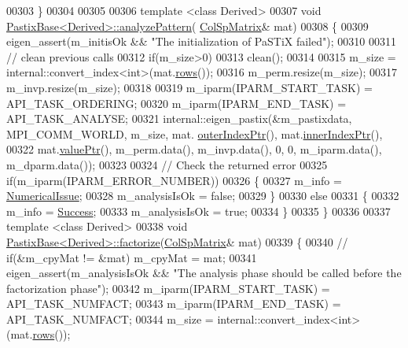 \begin{DoxyCode}
00303 \}
00304 
00305 
00306 \textcolor{keyword}{template} <\textcolor{keyword}{class} Derived>
00307 \textcolor{keywordtype}{void} \hyperlink{class_eigen_1_1_pastix_base}{PastixBase<Derived>::analyzePattern}(
      \hyperlink{group___sparse_core___module}{ColSpMatrix}& mat)
00308 \{                         
00309   eigen\_assert(m\_initisOk && \textcolor{stringliteral}{"The initialization of PaSTiX failed"});
00310   
00311   \textcolor{comment}{// clean previous calls}
00312   \textcolor{keywordflow}{if}(m\_size>0)
00313     clean();
00314   
00315   m\_size = internal::convert\_index<int>(mat.\hyperlink{group___sparse_core___module_a62e61bb861eee306d5b069ce652b5aa5}{rows}());
00316   m\_perm.resize(m\_size);
00317   m\_invp.resize(m\_size);
00318   
00319   m\_iparm(IPARM\_START\_TASK) = API\_TASK\_ORDERING;
00320   m\_iparm(IPARM\_END\_TASK) = API\_TASK\_ANALYSE;
00321   internal::eigen\_pastix(&m\_pastixdata, MPI\_COMM\_WORLD, m\_size, mat.
      \hyperlink{group___sparse_core___module_a75506964d86d6badb32d0b4917acf2e2}{outerIndexPtr}(), mat.\hyperlink{group___sparse_core___module_ae7b804bd39745156d20ca1611a296b67}{innerIndexPtr}(),
00322                mat.\hyperlink{group___sparse_core___module_a9d4354d3f4d121d764bbed33cac05329}{valuePtr}(), m\_perm.data(), m\_invp.data(), 0, 0, m\_iparm.data(), m\_dparm.data());
00323   
00324   \textcolor{comment}{// Check the returned error}
00325   \textcolor{keywordflow}{if}(m\_iparm(IPARM\_ERROR\_NUMBER))
00326   \{
00327     m\_info = \hyperlink{group__enums_gga85fad7b87587764e5cf6b513a9e0ee5eaaf9b736d310a664e7729d163a035cc5f}{NumericalIssue};
00328     m\_analysisIsOk = \textcolor{keyword}{false};
00329   \}
00330   \textcolor{keywordflow}{else}
00331   \{ 
00332     m\_info = \hyperlink{group__enums_gga85fad7b87587764e5cf6b513a9e0ee5ea52581b035f4b59c203b8ff999ef5fcea}{Success};
00333     m\_analysisIsOk = \textcolor{keyword}{true};
00334   \}
00335 \}
00336 
00337 \textcolor{keyword}{template} <\textcolor{keyword}{class} Derived>
00338 \textcolor{keywordtype}{void} \hyperlink{class_eigen_1_1_pastix_base}{PastixBase<Derived>::factorize}(\hyperlink{group___sparse_core___module}{ColSpMatrix}& mat)
00339 \{
00340 \textcolor{comment}{//   if(&m\_cpyMat != &mat) m\_cpyMat = mat;}
00341   eigen\_assert(m\_analysisIsOk && \textcolor{stringliteral}{"The analysis phase should be called before the factorization phase"});
00342   m\_iparm(IPARM\_START\_TASK) = API\_TASK\_NUMFACT;
00343   m\_iparm(IPARM\_END\_TASK) = API\_TASK\_NUMFACT;
00344   m\_size = internal::convert\_index<int>(mat.\hyperlink{group___sparse_core___module_a62e61bb861eee306d5b069ce652b5aa5}{rows}());

\end{DoxyCode}
